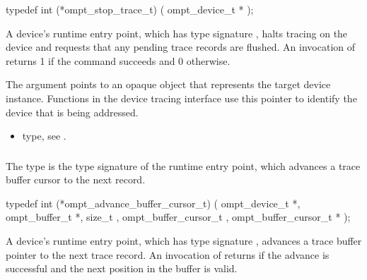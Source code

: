 \format
\begin{ccppspecific}
\begin{omptInquiry}
typedef int (*ompt_stop_trace_t) (
  ompt_device_t *
);
\end{omptInquiry}
\end{ccppspecific}

\descr
A device's  runtime entry point, which has type 
signature , halts tracing on the device and 
requests that any pending trace records are flushed. An invocation of 
 returns 1 if the command succeeds and 0 otherwise.

\argdesc
The  argument points to an opaque object that represents
the target device instance. Functions in the device tracing interface
use this pointer to identify the device that is being addressed.

\crossreferences
\begin{itemize}
\item {} type, see .
\end{itemize}



\subsubsection{}
\label{sec:ompt_advance_buffer_cursor_t}

\summary
The  type is the type signature of the 
 runtime entry point, which advances
a trace buffer cursor to the next record.

\format
\begin{ccppspecific}
\begin{omptInquiry}
typedef int (*ompt_advance_buffer_cursor_t) (
  ompt_device_t *,
  ompt_buffer_t *,
  size_t ,
  ompt_buffer_cursor_t ,
  ompt_buffer_cursor_t *
);
\end{omptInquiry}
\end{ccppspecific}

\descr
A device's  runtime entry point, which has 
type signature , advances a trace buffer
pointer to the next trace record. An invocation of 
 returns  if the advance is 
successful and the next position in the buffer is valid.

